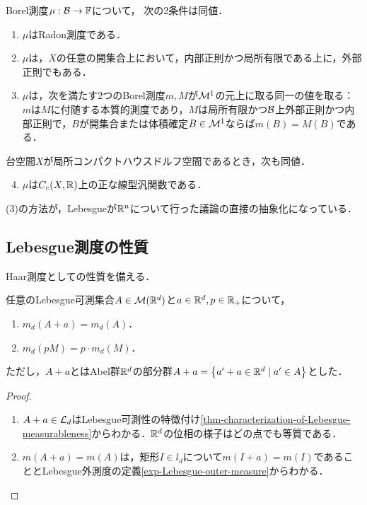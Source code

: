 \documentclass[uplatex, dvipdfmx]{jsreport}
\begin{document}
\begin{theorem}[Radon測度の特徴付け]
    Borel測度$\mu:\mathcal{B}\to\mathbb{F}$について，
    次の2条件は同値．
    \begin{enumerate}
        \item $\mu$はRadon測度である．
        \item $\mu$は，$X$の任意の開集合上において，内部正則かつ局所有限である上に，外部正則でもある．
        \item $\mu$は，次を満たす2つのBorel測度$m,M$が$\mathcal{M}^1$の元上に取る同一の値を取る：
        $m$は$M$に付随する本質的測度であり，$M$は局所有限かつ$\mathcal{B}$上外部正則かつ内部正則で，$B$が開集合または体積確定$B\in\mathcal{M}^1$ならば$m(B)=M(B)$である．
    \end{enumerate}
    台空間$X$が局所コンパクトハウスドルフ空間であるとき，次も同値．
    \begin{enumerate}\setcounter{enumi}{3}
        \item $\mu$は$C_c(X,\mathbb{R})$上の正な線型汎関数である．
    \end{enumerate}
\end{theorem}
\begin{remark}
    (3)の方法が，Lebesgueが$\mathbb{R}^n$について行った議論の直接の抽象化になっている．
\end{remark}

\subsection{Lebesgue測度の性質}

\begin{tcolorbox}[colframe=ForestGreen, colback=ForestGreen!10!white,breakable,colbacktitle=ForestGreen!40!white,coltitle=black,fonttitle=\bfseries\sffamily,
title=]
    Haar測度としての性質を備える．
\end{tcolorbox}

\begin{lemma}[Lebesgue測度の線形性]\label{lemma-invariability-of-Lebesgue-measure-under-parallel-transport}
    任意のLebesgue可測集合$A\in\mathcal{M}(\mathbb{R}^d)$と$a\in\mathbb{R}^d,p\in\mathbb{R}_+$について，
    \begin{enumerate}
        \item $m_d(A+a)=m_d(A)$．
        \item $m_d(pM)=p\cdot m_d(M)$．
    \end{enumerate}
    ただし，$A+a$とはAbel群$\mathbb{R}^d$の部分群$A+a=\left\{a'+a\in\mathbb{R}^d\mid a'\in A\right\}$とした．
\end{lemma}
\begin{proof}\mbox{}
    \begin{enumerate}
        \item $A+a\in\mathcal{L}_d$はLebesgue可測性の特徴付け\ref{thm-characterization-of-Lebesgue-measurableness}からわかる．$\mathbb{R}^d$の位相の様子はどの点でも等質である．
        \item $m(A+a)=m(A)$は，矩形$I\in l_d$について$m(I+a)=m(I)$であることとLebesgue外測度の定義\ref{exp-Lebesgue-outer-measure}からわかる．
    \end{enumerate}
\end{proof}
\end{document}
